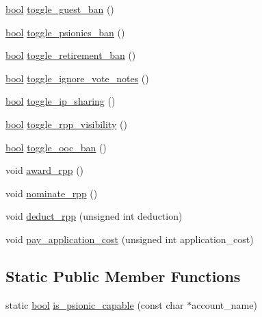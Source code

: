 \begin{DoxyCompactItemize}
\hyperlink{structs_8h_ad5c9d4ba3dc37783a528b0925dc981a0}{bool} \hyperlink{classaccount_a5665e374e84979e1a44deaa21aa64425}{toggle\-\_\-guest\-\_\-ban} ()
\item 
\hyperlink{structs_8h_ad5c9d4ba3dc37783a528b0925dc981a0}{bool} \hyperlink{classaccount_a55ffa6cc79590c1ad7bcdcc34773ad40}{toggle\-\_\-psionics\-\_\-ban} ()
\item 
\hyperlink{structs_8h_ad5c9d4ba3dc37783a528b0925dc981a0}{bool} \hyperlink{classaccount_ad6b872530fb10d791bb65461f5d75bef}{toggle\-\_\-retirement\-\_\-ban} ()
\item 
\hyperlink{structs_8h_ad5c9d4ba3dc37783a528b0925dc981a0}{bool} \hyperlink{classaccount_af1620f171e4ce24029ec022bde96b87a}{toggle\-\_\-ignore\-\_\-vote\-\_\-notes} ()
\item 
\hyperlink{structs_8h_ad5c9d4ba3dc37783a528b0925dc981a0}{bool} \hyperlink{classaccount_a6ce6cc28b05a5a25001d2b367e902426}{toggle\-\_\-ip\-\_\-sharing} ()
\item 
\hyperlink{structs_8h_ad5c9d4ba3dc37783a528b0925dc981a0}{bool} \hyperlink{classaccount_afb8ff878e54dacc069ec9281b1d85700}{toggle\-\_\-rpp\-\_\-visibility} ()
\item 
\hyperlink{structs_8h_ad5c9d4ba3dc37783a528b0925dc981a0}{bool} \hyperlink{classaccount_a9404079c48a6a7634d58bb8c651a6f8d}{toggle\-\_\-ooc\-\_\-ban} ()
\item 
void \hyperlink{classaccount_a29e4034d96e5beae49163df114458772}{award\-\_\-rpp} ()
\item 
void \hyperlink{classaccount_a84d07d9e4fbc89bf7caba589437968f8}{nominate\-\_\-rpp} ()
\item 
void \hyperlink{classaccount_ab06de856e2c3c2cb433e810ce27dcba7}{deduct\-\_\-rpp} (unsigned int deduction)
\item 
void \hyperlink{classaccount_afbb5827b42878259de2c5843331b00a2}{pay\-\_\-application\-\_\-cost} (unsigned int application\-\_\-cost)
\end{DoxyCompactItemize}
\subsection*{Static Public Member Functions}
\begin{DoxyCompactItemize}
\item 
static \hyperlink{structs_8h_ad5c9d4ba3dc37783a528b0925dc981a0}{bool} \hyperlink{classaccount_a794e867a84315ec47bbc948e5b89c4c2}{is\-\_\-psionic\-\_\-capable} (const char $\ast$account\-\_\-name)
\end{DoxyCompactItemize}
